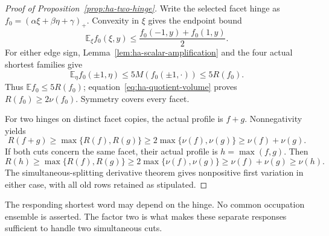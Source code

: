\begin{proof}[Proof of Proposition~\ref{prop:ha-two-hinge}]
Write the selected facet hinge as $f_0=(\alpha\xi+\beta\eta+\gamma)_+$.
Convexity in $\xi$ gives the endpoint bound
\[
 \mathbb E_\xi f_0(\xi,y)
       \leq\frac{f_0(-1,y)+f_0(1,y)}2.
\]
For either edge sign, Lemma~\ref{lem:ha-scalar-amplification} and the four
actual shortest families give
\[
 \mathbb E_\eta f_0(\pm1,\eta)
       \leq5M(f_0(\pm1,\cdot))\leq5R(f_0).
\]
Thus $\mathbb E f_0\leq5R(f_0)$; equation~\eqref{eq:ha-quotient-volume}
proves $R(f_0)\geq2\nu(f_0)$. Symmetry covers every facet.

For two hinges on distinct facet copies, the actual profile is $f+g$.
Nonnegativity yields
\[
 R(f+g)\geq\max\{R(f),R(g)\}
 \geq2\max\{\nu(f),\nu(g)\}\geq\nu(f)+\nu(g).
\]
If both cuts concern the same facet, their actual profile is $h=\max(f,g)$.
Then
\[
 R(h)\geq\max\{R(f),R(g)\}
 \geq2\max\{\nu(f),\nu(g)\}
 \geq\nu(f)+\nu(g)\geq\nu(h).
\]
The simultaneous-splitting derivative theorem gives nonpositive first
variation in either case, with all old rows retained as stipulated.
\end{proof}

The responding shortest word may depend on the hinge. No common occupation
ensemble is asserted. The factor two is what makes these separate responses
sufficient to handle two simultaneous cuts.
